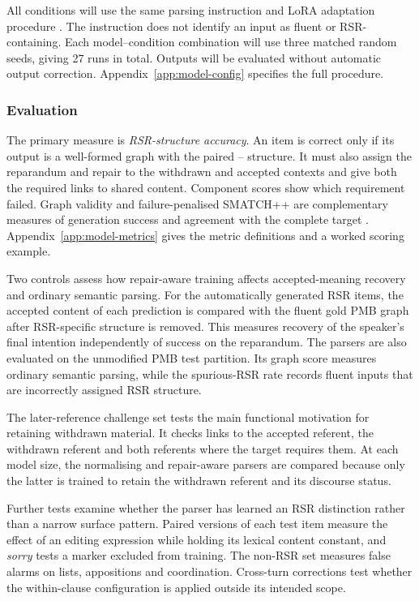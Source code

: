 All conditions will use the same parsing instruction and LoRA adaptation procedure
\citep{huLoRALowRankAdaptation2021}. The instruction does not identify an input
as fluent or RSR-containing. Each model--condition combination will use three
matched random seeds, giving 27 runs in total. Outputs will be evaluated
without automatic output correction. Appendix~\ref{app:model-config}
specifies the full procedure.

\subsubsection{Evaluation}

The primary measure is \emph{RSR-structure accuracy}. An item is correct
only if its output is a well-formed graph with the paired
-- structure. It must also assign the
reparandum and repair to the withdrawn and accepted contexts and give both the
required links to shared content. Component scores show which requirement
failed.
Graph validity and failure-penalised SMATCH++ are complementary measures
of generation success and agreement with the complete target
\citep{opitzSMATCHStandardizedExtended2023}. Appendix~\ref{app:model-metrics}
gives the metric definitions and a worked scoring example.

Two controls assess how repair-aware training affects accepted-meaning
recovery and ordinary semantic parsing. For the
automatically generated RSR items, the accepted content of each prediction is
compared with the fluent gold PMB graph after RSR-specific structure is
removed. This measures recovery of the speaker's final intention independently
of success on the reparandum. The parsers are also evaluated on the unmodified
PMB test partition. Its graph score measures ordinary semantic parsing, while
the spurious-RSR rate records fluent inputs that are incorrectly assigned RSR
structure.

The later-reference challenge set tests the main functional motivation for
retaining withdrawn material. It checks links to the accepted referent, the
withdrawn referent and both referents where the target requires them. At each
model size, the normalising and repair-aware parsers are compared because only
the latter is trained to retain the withdrawn referent and its discourse
status.

Further tests examine whether the parser has learned an RSR distinction rather
than a narrow surface pattern. Paired versions of each test item measure the
effect of an editing expression while holding its lexical content constant, and
\textit{sorry} tests a marker excluded from training. The non-RSR set
measures false alarms on lists, appositions and coordination. Cross-turn
corrections test whether the within-clause configuration is applied outside
its intended scope.

